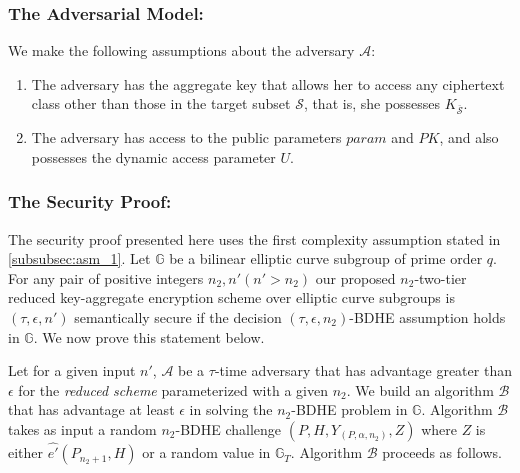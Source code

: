 \subsubsection{The Adversarial Model:} We make the following assumptions about the adversary $\mathcal{A}$:

\begin{enumerate}
 \item The adversary has the aggregate key that allows her to access any ciphertext class other than those in the target subset $\mathcal{S}$, that is, she possesses $K_{\overline{\mathcal{S}}}$.
 \item The adversary has access to the public parameters $param$ and $PK$, and also possesses the dynamic access parameter $U$.
\end{enumerate}


\subsubsection{The Security Proof:}

The security proof presented here uses the first complexity assumption stated in \ref{subsubsec:asm_1}. Let $\mathbb{G}$ be a bilinear elliptic curve subgroup of prime order $q$. For any pair of positive integers $n_2,n' (n'>n_2)$ our proposed $n_2$-two-tier reduced key-aggregate encryption scheme over elliptic curve subgroups is $(\tau,\epsilon,n')$ semantically secure if the decision $(\tau,\epsilon,n_2)$-BDHE assumption holds in $\mathbb{G}$. We now prove this statement below.

\textbf{} Let for a given input $n'$, $\mathcal{A}$ be a $\tau$-time adversary that has advantage greater than $\epsilon$ for the \emph{reduced scheme} parameterized with a given $n_2$. We build an algorithm $\mathcal{B}$ that has advantage at least $\epsilon$ in solving the $n_2$-BDHE problem in $\mathbb{G}$. Algorithm $\mathcal{B}$ takes as input a random $n_2$-BDHE challenge $(P,H,Y_{(P,\alpha,n_2)},Z)$ where $Z$ is either $\hat{e'}(P_{n_2+1},H)$ or a random value in $\mathbb{G}_T$. Algorithm $\mathcal{B}$ proceeds as follows.

